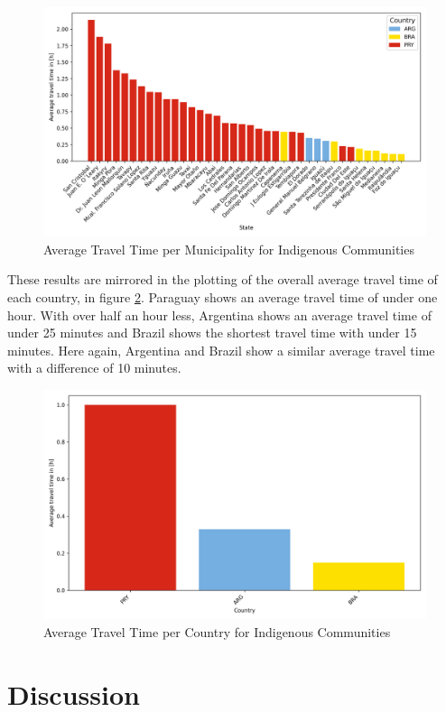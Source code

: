 \documentclass[11pt, a4paper]{report}
\begin{document}
\begin{figure}[H]
  \centering
  \includegraphics[width=0.9\linewidth]{figures/statesIC.png}
  \caption{Average Travel Time per Municipality for Indigenous Communities}
  \label{fig:traveltimeindigstatesplot}
\end{figure}
These results are mirrored in the plotting of the overall average travel time of each country, in figure \ref{fig:traveltimeindigcountriesplot}. Paraguay shows an average travel time of under one hour. With over half an hour less, Argentina shows an average travel time of under 25 minutes and Brazil shows the shortest travel time with under 15 minutes. Here again, Argentina and Brazil show a similar average travel time with a difference of 10 minutes.
\begin{figure}[H]
  \centering
  \includegraphics[width=0.9\linewidth]{figures/countriesIC.png}
  \caption{Average Travel Time per Country for Indigenous Communities}
  \label{fig:traveltimeindigcountriesplot}
\end{figure}

\chapter{Discussion}
\end{document}
